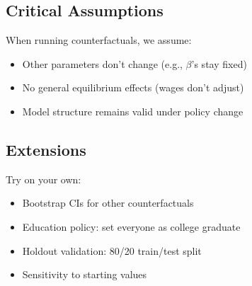 \documentclass[12pt,english]{article}
\begin{document}
\subsection{Critical Assumptions}
When running counterfactuals, we assume:
\begin{itemize}
    \item Other parameters don't change (e.g., $\beta$'s stay fixed)
    \item No general equilibrium effects (wages don't adjust)
    \item Model structure remains valid under policy change
\end{itemize}

\subsection{Extensions}
Try on your own:
\begin{itemize}
\item Bootstrap CIs for other counterfactuals
\item Education policy: set everyone as college graduate
\item Holdout validation: 80/20 train/test split
\item Sensitivity to starting values
\end{itemize}
\end{document}
